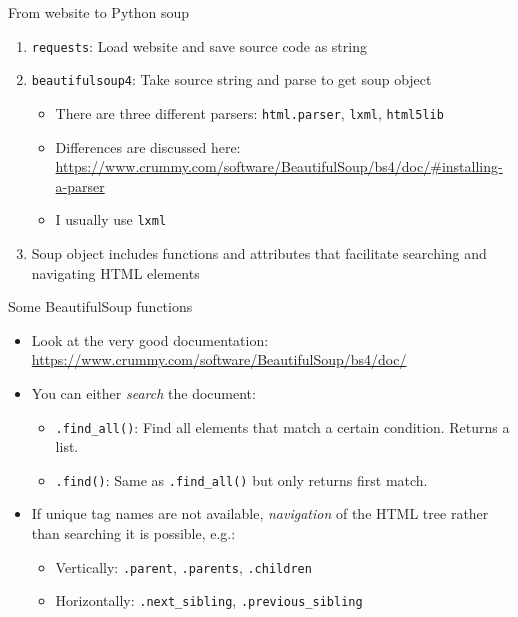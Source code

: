 \begin{frame}[fragile]{From website to Python soup}
\begin{enumerate}
	\item \texttt{requests}: Load website and save source code as string
	\item \texttt{beautifulsoup4}: Take source string and parse to get soup object
		\begin{itemize}
			\item There are three different parsers: \texttt{html.parser}, \texttt{lxml}, \texttt{html5lib}
			\item Differences are discussed here: \url{https://www.crummy.com/software/BeautifulSoup/bs4/doc/#installing-a-parser}
			\item I usually use \texttt{lxml}
		\end{itemize}
	\item Soup object includes functions and attributes that facilitate searching and navigating HTML elements
\end{enumerate}
\end{frame}

\begin{frame}[fragile]{Some BeautifulSoup functions}
\begin{itemize}
	\item Look at the very good documentation: \url{https://www.crummy.com/software/BeautifulSoup/bs4/doc/}
	\item You can either \textit{search} the document:
	\begin{itemize}
		\item \texttt{.find_all()}: Find all elements that match a certain condition. Returns a list.
		\item \texttt{.find()}: Same as \texttt{.find_all()} but only returns first match.
	\end{itemize}
	\item If unique tag names are not available, \textit{navigation} of the HTML tree rather than searching it is possible, e.g.:
	\begin{itemize}
		\item Vertically: \texttt{.parent}, \texttt{.parents}, \texttt{.children}
		\item Horizontally: \texttt{.next_sibling}, \texttt{.previous_sibling}
	\end{itemize}
\end{itemize}
\end{frame}